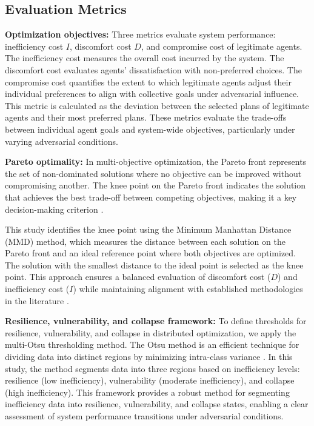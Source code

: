 \documentclass[journal]{IEEEtran}
\newcommand{\DiscomfortCost}{\ensuremath{D}}
\newcommand{\InefficiencyCost}{\ensuremath{I}}
\begin{document}
\subsection{Evaluation Metrics}

\textbf{Optimization objectives:} 
Three metrics evaluate system performance: inefficiency cost \InefficiencyCost{}, discomfort cost \DiscomfortCost{}, and compromise cost of legitimate agents. The inefficiency cost measures the overall cost incurred by the system. The discomfort cost evaluates agents' dissatisfaction with non-preferred choices. The compromise cost quantifies the extent to which legitimate agents adjust their individual preferences to align with collective goals under adversarial influence. This metric is calculated as the deviation between the selected plans of legitimate agents and their most preferred plans. These metrics evaluate the trade-offs between individual agent goals and system-wide objectives, particularly under varying adversarial conditions.

\textbf{Pareto optimality:}
In multi-objective optimization, the Pareto front represents the set of non-dominated solutions where no objective can be improved without compromising another. The knee point on the Pareto front indicates the solution that achieves the best trade-off between competing objectives, making it a key decision-making criterion \cite{sun2024knee, li2020knee}.

This study identifies the knee point using the Minimum Manhattan Distance (MMD) method, which measures the distance between each solution on the Pareto front and an ideal reference point where both objectives are optimized. The solution with the smallest distance to the ideal point is selected as the knee point. This approach ensures a balanced evaluation of discomfort cost (\DiscomfortCost{}) and inefficiency cost (\InefficiencyCost{}) while maintaining alignment with established methodologies in the literature \cite{li2020knee}.

\textbf{Resilience, vulnerability, and collapse framework:}
To define thresholds for resilience, vulnerability, and collapse in distributed optimization, we apply the multi-Otsu thresholding method. The Otsu method is an efficient technique for dividing data into distinct regions by minimizing intra-class variance \cite{otsu1979, merzban2019efficient}. In this study, the method segments data into three regions based on inefficiency levels: resilience (low inefficiency), vulnerability (moderate inefficiency), and collapse (high inefficiency). This framework provides a robust method for segmenting inefficiency data into resilience, vulnerability, and collapse states, enabling a clear assessment of system performance transitions under adversarial conditions.
\end{document}
